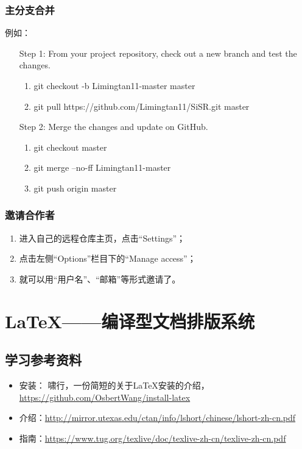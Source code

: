 \subsection{主分支合并}
例如：
\begin{itemize}
\item[Step 1:] From your project repository, check out a new branch and test the changes.
\begin{enumerate}
\item git checkout -b Limingtan11-master master

\item git pull https://github.com/Limingtan11/SiSR.git master
\end{enumerate}

\item [Step 2:] Merge the changes and update on GitHub.
\begin{enumerate}
\item  git checkout master

\item git merge --no-ff Limingtan11-master

\item git push origin master
\end{enumerate}
\end{itemize}



\subsection{邀请合作者}
\begin{enumerate}
\item 进入自己的远程仓库主页，点击“Settings”；
\item 点击左侧“Options”栏目下的“Manage access”；
\item 就可以用“用户名”、“邮箱”等形式邀请了。
\end{enumerate}













\chapter{\LaTeX{}——编译型文档排版系统}
\section{学习参考资料}
\begin{itemize}
\item 安装： 啸行，一份简短的关于\LaTeX{}安装的介绍，\url{https://github.com/OsbertWang/install-latex}
\item 介绍：\url{http://mirror.utexas.edu/ctan/info/lshort/chinese/lshort-zh-cn.pdf}
\item 指南：\url{https://www.tug.org/texlive/doc/texlive-zh-cn/texlive-zh-cn.pdf}
\end{itemize}


